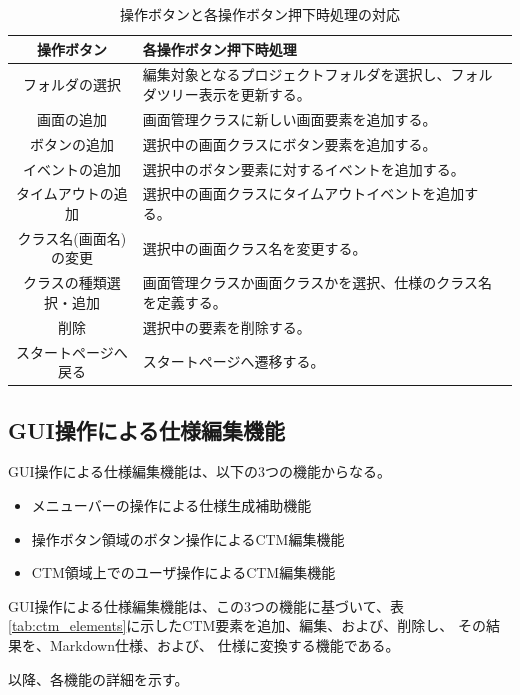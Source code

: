 \begin{table}[tp]
  \centering
  \caption{操作ボタンと各操作ボタン押下時処理の対応}
  \label{tab:Look_patterns_operations}
  \begin{tabularx}{\linewidth}{|c|X|}
    \hline
    \textbf{操作ボタン} & \textbf{各操作ボタン押下時処理} \\
    \hline
    フォルダの選択 &
    編集対象となるプロジェクトフォルダを選択し、フォルダツリー表示を更新する。 \\
    \hline
    画面の追加 &
    画面管理クラスに新しい画面要素を追加する。 \\
    \hline
    ボタンの追加 &
    選択中の画面クラスにボタン要素を追加する。 \\
    \hline
    イベントの追加 &
    選択中のボタン要素に対するイベントを追加する。 \\
    \hline
    タイムアウトの追加 &
    選択中の画面クラスにタイムアウトイベントを追加する。 \\
    \hline
    クラス名(画面名)の変更 &
    選択中の画面クラス名を変更する。 \\
    \hline
    クラスの種類選択・追加 &
    画面管理クラスか画面クラスかを選択、仕様のクラス名を定義する。 \\
    \hline
    削除 &
    選択中の要素を削除する。 \\
    \hline
    スタートページへ戻る &
    スタートページへ遷移する。 \\
    \hline
  \end{tabularx}
\end{table}

\subsection{GUI操作による仕様編集機能}\label{sec:VDM++-generation-function}
GUI操作による仕様編集機能は、以下の3つの機能からなる。
\begin{itemize}
\item メニューバーの操作による仕様生成補助機能
\item 操作ボタン領域のボタン操作によるCTM編集機能
\item CTM領域上でのユーザ操作によるCTM編集機能
\end{itemize}

GUI操作による仕様編集機能は、この3つの機能に基づいて、表\ref{tab:ctm_elements}に示したCTM要素を追加、編集、および、削除し、
その結果を、Markdown仕様、および、
\VDM 仕様に変換する機能である。

以降、各機能の詳細を示す。

